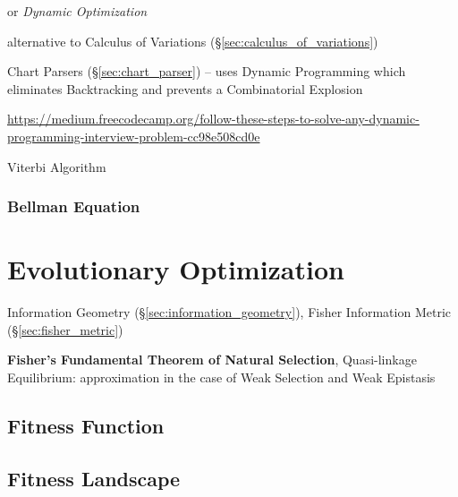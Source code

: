 or \emph{Dynamic Optimization}

alternative to Calculus of Variations (\S\ref{sec:calculus_of_variations})

\fist Chart Parsers (\S\ref{sec:chart_parser}) -- uses Dynamic Programming which
eliminates Backtracking and prevents a Combinatorial Explosion

\url{https://medium.freecodecamp.org/follow-these-steps-to-solve-any-dynamic-programming-interview-problem-cc98e508cd0e}

Viterbi Algorithm



\subsubsection{Bellman Equation}\label{sec:bellman_equation}



\section{Evolutionary Optimization}\label{sec:evolutionary_optimization}

\fist Information Geometry (\S\ref{sec:information_geometry}), Fisher
Information Metric (\S\ref{sec:fisher_metric})

\fist \textbf{Fisher's Fundamental Theorem of Natural Selection},
Quasi-linkage Equilibrium: approximation in the case of Weak Selection
and Weak Epistasis %



\subsection{Fitness Function}\label{sec:fitness_function}

\subsection{Fitness Landscape}\label{sec:fitness_landscape}

